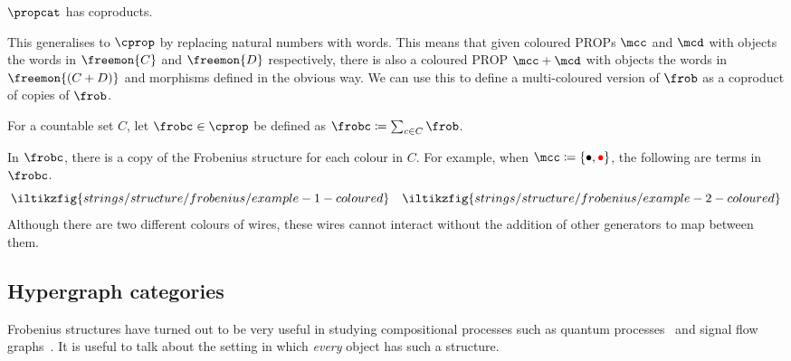 \begin{theorem}
    \(\propcat\) has coproducts.
\end{theorem}

This generalises to \(\cprop\) by replacing natural numbers with words.
This means that given coloured PROPs \(\mcc\) and \(\mcd\) with objects the
words in \(\freemon{C}\) and \(\freemon{D}\) respectively, there is also a
coloured PROP \(\mcc + \mcd\) with objects the words in \(\freemon{(C + D)}\)
and morphisms defined in the obvious way.
We can use this to define a multi-coloured version of \(\frob\) as
a coproduct of copies of \(\frob\).

\begin{definition}
    \label{def:frobc}
    For a countable set \(C\), let \(\frobc \in \cprop\) be
    defined as \(\frobc \coloneqq \sum_{c \in C}\frob\).
\end{definition}

\begin{example}
    In \(\frobc\), there is a copy of the Frobenius structure for each colour
    in \(C\).
    For example, when \(\mcc \coloneqq \{\bullet,\redbullet\}\), the following
    are terms in \(\frobc\).
    \[
        \iltikzfig{strings/structure/frobenius/example-1-coloured}
        \quad
        \iltikzfig{strings/structure/frobenius/example-2-coloured}
    \]
    Although there are two different colours of wires, these wires cannot
    interact without the addition of other generators to map between them.
\end{example}


\subsection{Hypergraph categories}

Frobenius structures have turned out to be very useful in studying compositional
processes such as quantum processes~\cite{coecke2008interacting} and signal flow
graphs~\cite{bonchi2014categorical,bonchi2015full}.
It is useful to talk about the setting in which \emph{every} object has such a
structure.

